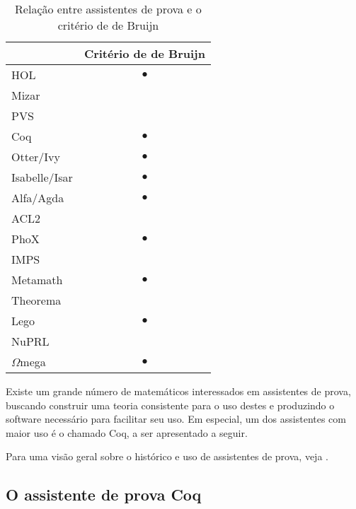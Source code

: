 \begin{table}[h]
\centering
\caption{Relação entre assistentes de prova e o critério de de Bruijn \cite{freek}}
\label{table:dbj_crit}
\begin{tabular}{l|c}
              & \multicolumn{1}{l}{Critério de de Bruijn} \\ \hline
HOL           & $\bullet$                                 \\
Mizar         & \multicolumn{1}{l}{}                      \\
PVS           & \multicolumn{1}{l}{}                      \\ 
Coq           & $\bullet$                                 \\
Otter/Ivy     & $\bullet$                                 \\
Isabelle/Isar & $\bullet$                                 \\
Alfa/Agda     & $\bullet$                                 \\
ACL2          &                                           \\
PhoX          & $\bullet$                                 \\
IMPS          &                                           \\
Metamath      & $\bullet$                                 \\
Theorema      &                                           \\
Lego          & $\bullet$                                 \\
NuPRL         &                                           \\
$\Omega$mega  & $\bullet$                                        
\end{tabular}
\end{table}


Existe um grande número de matemáticos interessados em assistentes de prova,
buscando construir uma teoria consistente para o uso destes e produzindo o
software necessário para facilitar seu uso. Em especial, um dos assistentes com
maior uso é o chamado Coq, a ser apresentado a seguir.

Para uma visão geral sobre o histórico e uso de assistentes de prova, veja
\cite{proof_assist}. 

\subsection{O assistente de prova Coq}

